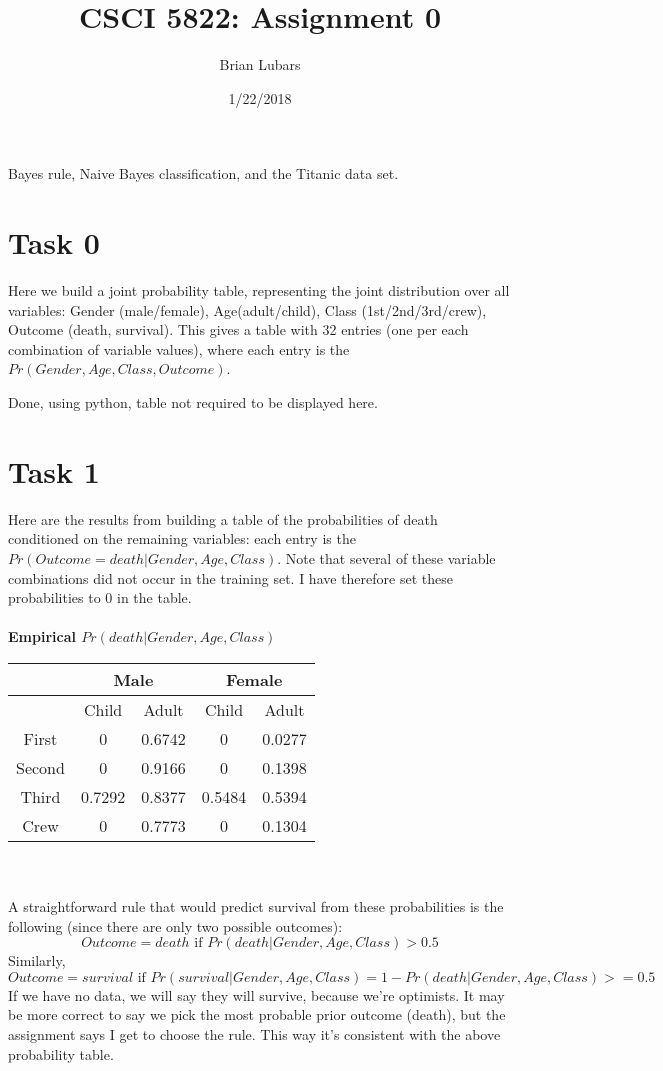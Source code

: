\documentclass[letterpaper, 10pt]{article}
\title{CSCI 5822: Assignment 0}
\author{Brian Lubars}
\date{1/22/2018}
\begin{document}
\maketitle

Bayes rule, Naive Bayes classification, and the Titanic data set.

\section{Task 0}
Here we build a joint probability table, representing the joint distribution over all variables: Gender (male/female), Age(adult/child), Class (1st/2nd/3rd/crew), Outcome (death, survival). This gives a table with 32 entries (one per each combination of variable values), where each entry is the $Pr(Gender, Age, Class, Outcome)$.

Done, using python, table not required to be displayed here.

\section{Task 1}
Here are the results from building a table of the probabilities of death conditioned on the remaining variables: each entry is the $Pr(Outcome=death | Gender, Age, Class)$. Note that several of these variable combinations did not occur in the training set. I have therefore set these probabilities to 0 in the table.
\\\\
\textbf{Empirical $Pr(death|Gender, Age, Class)$}\\
\begin{tabular}{| c | c | c | c | c | }
    \hline
    & \multicolumn{2}{|c|}{Male} & \multicolumn{2}{|c|}{Female} \\ \hline
            & Child     & Adult     & Child     & Adult     \\ \hline
    First   & 0         & 0.6742    & 0         & 0.0277    \\ \hline
    Second  & 0         & 0.9166    & 0         & 0.1398    \\ \hline
    Third   & 0.7292    & 0.8377    & 0.5484    & 0.5394    \\ \hline
    Crew    & 0         & 0.7773    & 0         & 0.1304    \\ 
    \hline
\end{tabular}
\\\\
A straightforward rule that would predict survival from these probabilities is the following (since there are only two possible outcomes): 
$$Outcome = death \text{ if } Pr(death|Gender, Age, Class) > 0.5$$
Similarly, 
$$Outcome = survival \text{ if } Pr(survival|Gender, Age, Class) = 1 - Pr(death|Gender, Age, Class) >= 0.5$$
If we have no data, we will say they will survive, because we're optimists. It may be more correct to say we pick the most probable prior outcome (death), but the assignment says I get to choose the rule. This way it's consistent with the above probability table.
\end{document}
